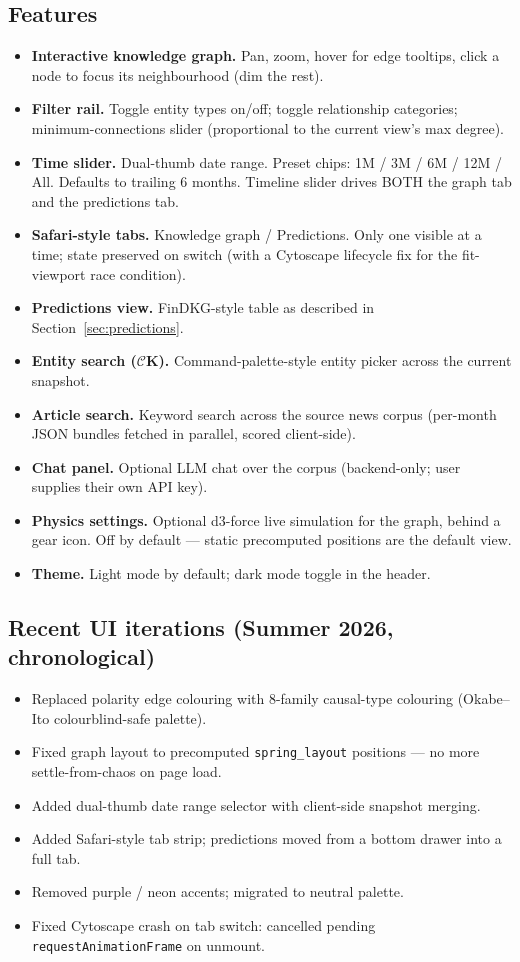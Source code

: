 \documentclass[11pt]{article}
\begin{document}
\subsection{Features}
\begin{itemize}
  \item \textbf{Interactive knowledge graph.} Pan, zoom, hover for edge tooltips, click a node to focus its neighbourhood (dim the rest).
  \item \textbf{Filter rail.} Toggle entity types on/off; toggle relationship categories; minimum-connections slider (proportional to the current view's max degree).
  \item \textbf{Time slider.} Dual-thumb date range. Preset chips: 1M / 3M / 6M / 12M / All. Defaults to trailing 6 months. Timeline slider drives BOTH the graph tab and the predictions tab.
  \item \textbf{Safari-style tabs.} Knowledge graph / Predictions. Only one visible at a time; state preserved on switch (with a Cytoscape lifecycle fix for the fit-viewport race condition).
  \item \textbf{Predictions view.} FinDKG-style table as described in Section~\ref{sec:predictions}.
  \item \textbf{Entity search (\(\mathcal{C}\)K).} Command-palette-style entity picker across the current snapshot.
  \item \textbf{Article search.} Keyword search across the source news corpus (per-month JSON bundles fetched in parallel, scored client-side).
  \item \textbf{Chat panel.} Optional LLM chat over the corpus (backend-only; user supplies their own API key).
  \item \textbf{Physics settings.} Optional d3-force live simulation for the graph, behind a gear icon. Off by default --- static precomputed positions are the default view.
  \item \textbf{Theme.} Light mode by default; dark mode toggle in the header.
\end{itemize}

\subsection{Recent UI iterations (Summer 2026, chronological)}
\begin{itemize}
  \item Replaced polarity edge colouring with 8-family causal-type colouring (Okabe--Ito colourblind-safe palette).
  \item Fixed graph layout to precomputed \texttt{spring\_layout} positions --- no more settle-from-chaos on page load.
  \item Added dual-thumb date range selector with client-side snapshot merging.
  \item Added Safari-style tab strip; predictions moved from a bottom drawer into a full tab.
  \item Removed purple / neon accents; migrated to neutral palette.
  \item Fixed Cytoscape crash on tab switch: cancelled pending \texttt{requestAnimationFrame} on unmount.
\end{itemize}
\end{document}
